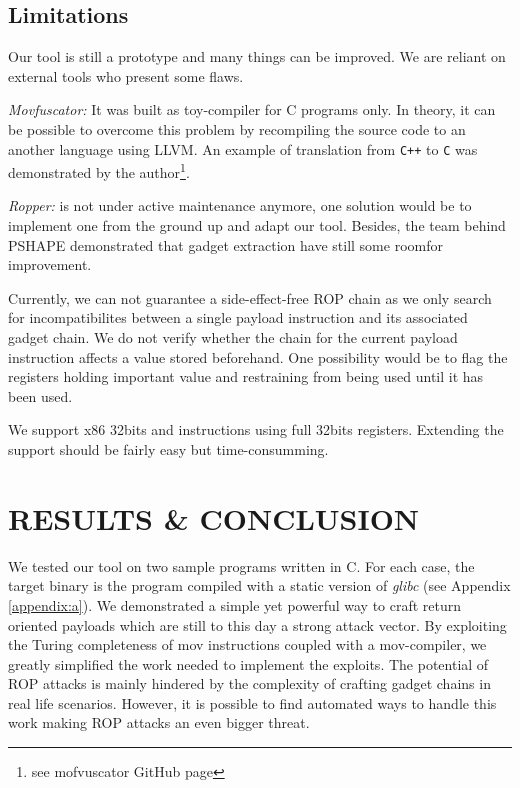\documentclass[10pt,twocolumn]{article}
\begin{document}
\subsection{Limitations}
Our tool is still a prototype and many things can be improved. We
are reliant on external tools who present some flaws.

\textit{Movfuscator:} It was built as toy-compiler for C programs only. In
theory, it can be possible to overcome this problem by recompiling the source
code to an another language using LLVM. An example of translation from
\texttt{C++} to \texttt{C} was demonstrated by the author\footnote{see
mofvuscator GitHub page}.

\textit{Ropper:} is not under active maintenance anymore, one solution would be
to implement one from the ground up and adapt our tool. Besides, the team
behind PSHAPE demonstrated that gadget extraction have still some roomfor
improvement.

Currently, we can not guarantee a side-effect-free ROP chain as we only search
for incompatibilites between a single payload instruction and its associated
gadget chain. We do not verify whether the chain for the current
payload instruction affects a value stored beforehand. One possibility would be
to flag the registers holding important value and restraining from being used
until it has been used.

We support x86 32bits and instructions using full 32bits registers. Extending
the support should be fairly easy but time-consumming.





  
\section{RESULTS \& CONCLUSION}
  We tested our tool on two sample programs written in C. For each case, the
  target binary is the program compiled with a static version of \textit{glibc}
  (see Appendix \ref{appendix:a}).
  We demonstrated a simple yet powerful way to craft return oriented payloads
  which are still to this day a strong attack vector. By exploiting the Turing
  completeness of mov instructions coupled with a mov-compiler, we greatly
  simplified the work needed to implement the exploits. The potential of ROP
  attacks is mainly hindered by the complexity of crafting gadget chains in real
  life scenarios. However, it is possible to find automated ways to handle this
  work making ROP attacks an even bigger threat.
\end{document}
